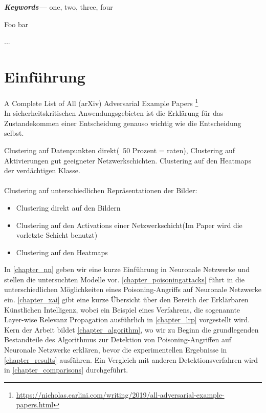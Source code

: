 \documentclass[twoside, 12pt,a4paper]{article}
\providecommand{\keywords}[1]
{
	\small	
	\textbf{\textit{Keywords---}} #1
}
\numberwithin{equation}{section}
\begin{document}
	\keywords{one, two, three, four}
	\newpage
	\listoffigures
	
	\listoftables
	
	\lstlistoflistings
	
	\listofalgorithms
	\newpage
	\tableofcontents
	\newpage
	

	
	
	\begin{algorithm} 
		\caption{Foo bar} 
		... 
	\end{algorithm} 
	\section{Einführung}
	
	A Complete List of All (arXiv) Adversarial Example Papers \footnote{\url{https://nicholas.carlini.com/writing/2019/all-adversarial-example-papers.html}}
	\\
	In sicherheitskritischen Anwendungsgebieten ist die Erklärung für das Zustandekommen einer Entscheidung genauso wichtig wie die Entscheidung selbst\cite{LRP_DNN}.
	
	Clustering auf Datenpunkten direkt(~50 Prozent = raten), Clustering auf Aktivierungen gut geeigneter Netzwerkschichten. Clustering auf den Heatmaps der verdächtigen Klasse.\\
	\\
	
	Clustering auf unterschiedlichen Repräsentationen der Bilder:
	\begin{itemize}
		\item Clustering direkt auf den Bildern\\
		\item Clustering auf den Activations einer Netzwerkschicht(Im Paper \cite{AC} wird die vorletzte Schicht benutzt)
		\item Clustering auf den Heatmaps
	\end{itemize}
	In \autoref{chapter_nn} geben wir eine kurze Einführung in Neuronale Netzwerke und stellen die untersuchten Modelle vor. \autoref{chapter_poisoningattacks} führt in die unterschiedlichen Möglichkeiten eines Poisoning-Angriffs auf Neuronale Netzwerke ein. \autoref{chapter_xai} gibt eine kurze Übersicht über den Bereich der Erklärbaren Künstlichen Intelligenz, wobei ein Beispiel eines Verfahrens, die sogenannte Layer-wise Relevanz Propagation ausführlich in \autoref{chapter_lrp} vorgestellt wird. Kern der Arbeit bildet \autoref{chapter_algorithm}, wo wir zu Beginn die grundlegenden Bestandteile des Algorithmus zur Detektion von Poisoning-Angriffen auf Neuronale Netzwerke erklären, bevor die experimentellen Ergebnisse in \autoref{chapter_results} ausführen. Ein Vergleich mit anderen Detektionsverfahren wird in \autoref{chapter_comparisons} durchgeführt.
\end{document}
